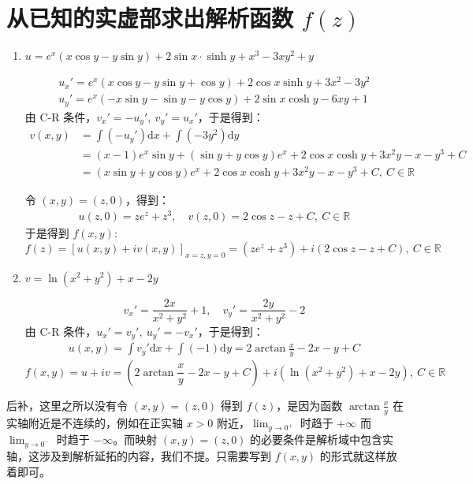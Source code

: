 \documentclass[UTF8]{report}
\def\R{\mathbb{R}}
\theoremstyle{MyLineTheoremStyle} %
\theoremstyle{MyBlockTheoremStyle} %
\theoremstyle{MySubsubsectionStyle} %
\begin{document}
\section{从已知的实虚部求出解析函数 $f(z)$}

\begin{enumerate}
\item $u = e^x(x\cos y - y\sin y) + 2\sin x \cdot \sinh y + x^3 - 3xy^2 +y$

\begin{gather}
u_x' = e^x(x\cos y -y\sin y + \cos y) + 2\cos x \sinh y +3x^2 - 3y^2 \\ 
u_y' = e^x(-x\sin y - \sin y - y\cos y ) + 2\sin x \cosh y - 6xy +1
\end{gather}
由 C-R 条件，$v_x' = -u_y',\ v_y' = u_x'$，于是得到：
\begin{align}
v(x,y) 
&= \int (-u_y')\mathrm{d}x + \int (-3y^2) \mathrm{d}y \\
&= (x-1)e^x\sin y  + (\sin y +y \cos y) e^x + 2\cos x \cosh y + 3x^2y - x - y^3 + C\\ 
&= (x\sin y + y\cos y)e^x + 2\cos x \cosh y + 3x^2y -x -y^3 + C,\ C \in \R
\end{align}

令 $(x,y) = (z,0)$，得到：
\begin{gather}
u(z,0) = ze^z + z^3,\quad v(z,0) = 2\cos z - z +C,\ C \in \R
\end{gather}
于是得到 $f(x,y)$:
\begin{equation*}
f(z) = \left[u(x,y) + iv(x,y)\right]_{x=z,y=0}
= 
(ze^z + z^3) + i(2\cos z -z +C),\ C \in \R
\end{equation*}


\item $v = \ln (x^2 + y^2) + x -2y$

\begin{equation*}
v_x' = \frac{2x}{x^2 + y^2} + 1, \quad v_y' = \frac{2y}{x^2 + y^2} -2
\end{equation*}
由 C-R 条件，$u_x' = v_y',\ u_y' = -v_x'$，于是得到：
\begin{align}
u(x,y) 
= \int v_y' \mathrm{d}x +  \int (-1)\mathrm{d}y = 2\arctan \frac{x}{y} - 2x -y + C
\end{align}
\begin{equation*}
f(x,y) = u + iv = (2\arctan \frac{x}{y} - 2x -y + C) + i(\ln (x^2 + y^2) + x -2y),\ C \in \R
\end{equation*}
\end{enumerate}
{\par\color{gray}\small
后补，这里之所以没有令 $(x,y) = (z,0)$ 得到 $f(z)$，是因为函数 $\arctan \frac{x}{y}$ 在实轴附近是不连续的，例如在正实轴 $x>0$ 附近，$\lim_{y \to 0^+}$ 时趋于 $+\infty$ 而 $\lim_{y \to 0^-}$ 时趋于 $-\infty$。而映射 $(x,y) = (z,0)$ 的必要条件是解析域中包含实轴，这涉及到解析延拓的内容，我们不提。只需要写到 $f(x,y)$ 的形式就这样放着即可。
\par}
\end{document}
